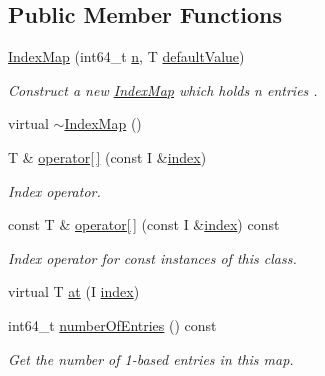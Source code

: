 \subsection*{Public Member Functions}
\begin{DoxyCompactItemize}
\item 
\hyperlink{class_networ_kit_1_1_index_map_a994d0a23af13a7eb8cfae44d14fd7dab}{Index\-Map} (int64\-\_\-t \hyperlink{class_networ_kit_1_1_index_map_aabb9796ff1a0c002446b14ff7d4fffbc}{n}, T \hyperlink{class_networ_kit_1_1_index_map_aa7b9e890a78e37f9e1fd1978b3706c4c}{default\-Value})
\begin{DoxyCompactList}\small\item\em Construct a new \hyperlink{class_networ_kit_1_1_index_map}{Index\-Map} which holds n entries . \end{DoxyCompactList}\item 
virtual \hyperlink{class_networ_kit_1_1_index_map_a8708a9f45cbd25368b18ad62eda39d50}{$\sim$\-Index\-Map} ()
\item 
T \& \hyperlink{class_networ_kit_1_1_index_map_aa8486b4e644ee023322b8e5de624012c}{operator\mbox{[}$\,$\mbox{]}} (const I \&\hyperlink{namespace_networ_kit_af49e67df68af41dcd75dffbb1e9abee6}{index})
\begin{DoxyCompactList}\small\item\em Index operator. \end{DoxyCompactList}\item 
const T \& \hyperlink{class_networ_kit_1_1_index_map_a96cdbc04080f3acfed51b12267c31732}{operator\mbox{[}$\,$\mbox{]}} (const I \&\hyperlink{namespace_networ_kit_af49e67df68af41dcd75dffbb1e9abee6}{index}) const 
\begin{DoxyCompactList}\small\item\em Index operator for const instances of this class. \end{DoxyCompactList}\item 
virtual T \hyperlink{class_networ_kit_1_1_index_map_adf2c9ecee594a7ef579a42019619b39e}{at} (I \hyperlink{namespace_networ_kit_af49e67df68af41dcd75dffbb1e9abee6}{index})
\item 
int64\-\_\-t \hyperlink{class_networ_kit_1_1_index_map_a20b9a522db36a731e67e1e84fe9d7aec}{number\-Of\-Entries} () const 
\begin{DoxyCompactList}\small\item\em Get the number of 1-\/based entries in this map. \end{DoxyCompactList}\item 

\end{DoxyCompactItemize}
